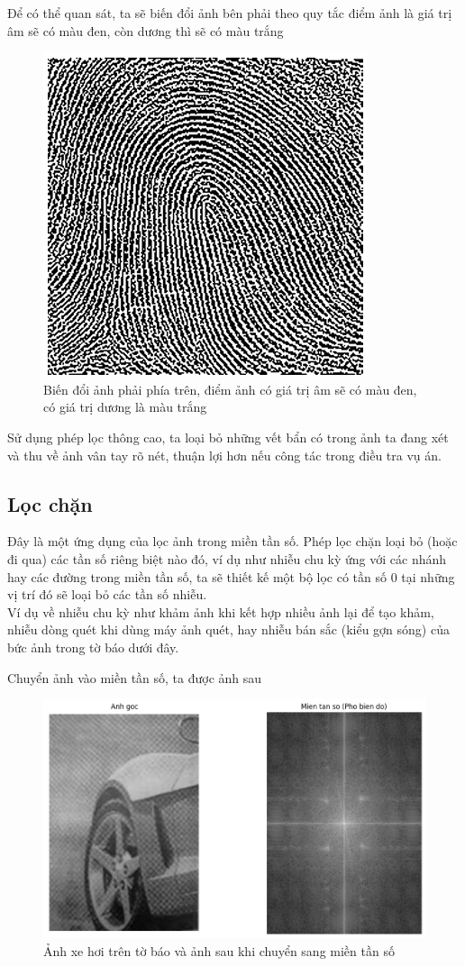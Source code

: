 \documentclass[12pt,a4paper]{report}
\numberwithin{equation}{section}
\theoremstyle{definition} %
\begin{document}
Để có thể quan sát, ta sẽ biến đổi ảnh bên phải theo quy tắc điểm ảnh là giá trị âm sẽ có màu đen, còn dương thì sẽ có màu trắng

\begin{figure}[H]
	\centering
	\includegraphics[width=0.68\linewidth]{img/ungdungsacanh/vantay1.png}
	\caption{Biến đổi ảnh phải phía trên, điểm ảnh có giá trị âm sẽ có màu đen, có giá trị dương là màu trắng}
\end{figure}

Sử dụng phép lọc thông cao, ta loại bỏ những vết bẩn có trong ảnh ta đang xét và thu về ảnh vân tay rõ nét, thuận lợi hơn nếu công tác trong điều tra vụ án.
\subsection{Lọc chặn}
Đây là một ứng dụng của lọc ảnh trong miền tần số. Phép lọc chặn loại bỏ (hoặc đi qua) các tần số riêng biệt nào đó, ví dụ như nhiễu chu kỳ ứng với các nhánh hay các đường trong miền tần số, ta sẽ thiết kế một bộ lọc có tần số 0 tại những vị trí đó sẽ loại bỏ các tần số nhiễu.\\

Ví dụ về nhiễu chu kỳ như khảm ảnh khi kết hợp nhiều ảnh lại để tạo khảm, nhiễu dòng quét khi dùng máy ảnh quét, hay nhiễu bán sắc (kiểu gợn sóng) của bức ảnh trong tờ báo dưới đây.

Chuyển ảnh vào miền tần số, ta được ảnh sau
\begin{figure}[H]
\centering
\includegraphics[width=0.86\linewidth]{img/locChan/XehoiSaulocchan.png}
\caption{Ảnh xe hơi trên tờ báo và ảnh sau khi chuyển sang miền tần số}
\end{figure}
\end{document}

